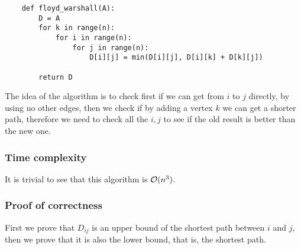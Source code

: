\documentclass[12pt]{extarticle}
\begin{document}
\begin{verbatim}
    def floyd_warshall(A):
        D = A
        for k in range(n):
            for i in range(n):
                for j in range(n):
                    D[i][j] = min(D[i][j], D[i][k] + D[k][j])

        return D
\end{verbatim}

The idea of the algorithm is to check first if we can get from $i$ to $j$ directly, by using no other edges, then we check if by adding a vertex $k$ we can get a shorter path, therefore we need to check all the $i, j$ to see if the old result is better than the new one.

\subsubsection{Time complexity}

It is trivial to see that this algorithm is $\mathcal{O}(n^3)$.

\subsubsection{Proof of correctness}

First we prove that $D_{ij}$ is an upper bound of the shortest path between $i$ and $j$, then we prove that it is also the lower bound, that is, the shortest path.
\end{document}
